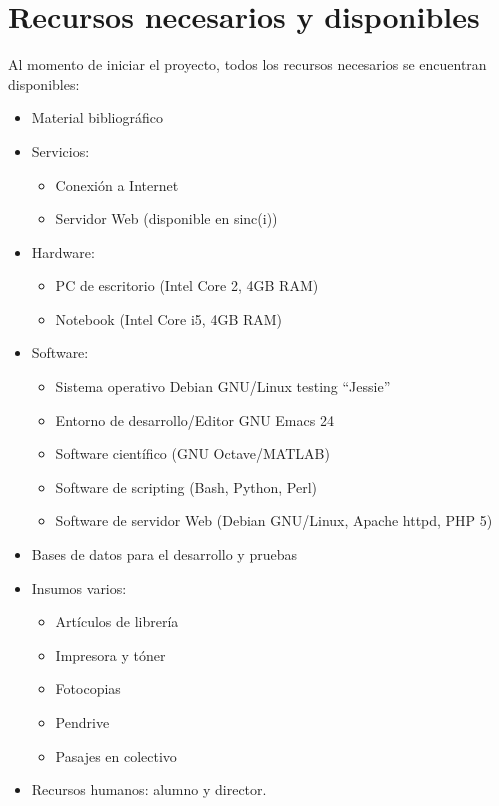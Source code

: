 \documentclass[12pt,bibliography=oldstyle,DIV=12,parskip=full-,titlepage]{scrartcl}
\begin{document}
\section{Recursos necesarios y disponibles}
Al momento de iniciar el proyecto, todos los recursos necesarios se
encuentran disponibles:
\begin{itemize}
\item Material bibliográfico
\item Servicios:
  \begin{itemize}
  \item Conexión a Internet
  \item Servidor Web (disponible en sinc(i))
  \end{itemize}
\item Hardware:
  \begin{itemize}
  \item PC de escritorio (Intel Core 2, 4GB RAM)
  \item Notebook (Intel Core i5, 4GB RAM)
  \end{itemize}
\item Software:
  \begin{itemize}
  \item Sistema operativo Debian GNU/Linux testing ``Jessie''
  \item Entorno de desarrollo/Editor GNU Emacs 24
  \item Software científico (GNU Octave/MATLAB)
  \item Software de scripting (Bash, Python, Perl)
  \item Software de servidor Web (Debian GNU/Linux, Apache
    httpd, PHP 5)
  \end{itemize}
\item Bases de datos para el desarrollo y pruebas
\item Insumos varios:
  \begin{itemize}
  \item Artículos de librería
  \item Impresora y tóner
  \item Fotocopias
  \item Pendrive
  \item Pasajes en colectivo
  \end{itemize}
\item Recursos humanos: alumno y director.
\end{itemize}
%
%
\newpage
\end{document}
